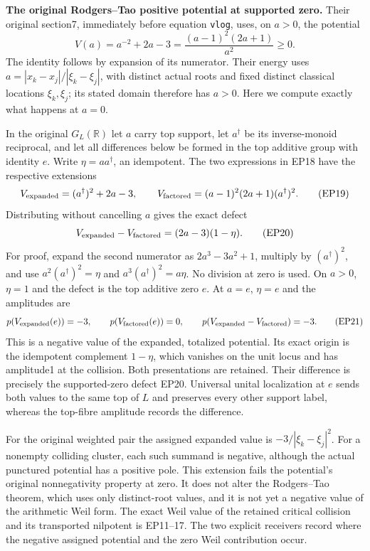 \EP\textbf{The original Rodgers--Tao positive potential at supported zero.}
Their original section7, immediately before equation \texttt{vlog},
uses, on $a>0$, the potential
\[
 V(a)=a^{-2}+2a-3
      =\frac{(a-1)^2(2a+1)}{a^2}\ge0.
 \tag{EP18}\label{ep:potential}
\]
The identity follows by expansion of its numerator. Their energy
uses $a=|x_k-x_j|/|\xi_k-\xi_j|$, with distinct actual roots and
fixed distinct classical locations $\xi_k,\xi_j$; its stated domain
therefore has $a>0$. Here we compute exactly what happens at $a=0$.

In the original $G_L(\mathbb R)$ let $a$ carry top support, let
$a^\dagger$ be its inverse-monoid reciprocal, and let all differences
below be formed in the top additive group with identity $e$.
Write $\eta=aa^\dagger$, an idempotent. The two expressions
in EP18 have the respective extensions
\[
 V_{\rm expanded}=(a^\dagger)^2+2a-3,\qquad
 V_{\rm factored}=(a-1)^2(2a+1)(a^\dagger)^2.
 \tag{EP19}
\]
Distributing without cancelling $a$ gives the exact defect
\[
 V_{\rm expanded}-V_{\rm factored}
           =(2a-3)(1-\eta).
 \tag{EP20}\label{ep:potentialdefect}
\]
For proof, expand the second numerator as $2a^3-3a^2+1$,
multiply by $(a^\dagger)^2$, and use $a^2(a^\dagger)^2=\eta$
and $a^3(a^\dagger)^2=a\eta$. No division at zero is used.
On $a>0$, $\eta=1$ and the defect is the top additive zero $e$.
At $a=e$, $\eta=e$ and the amplitudes are
\[
 p(V_{\rm expanded}(e))=-3,\qquad
 p(V_{\rm factored}(e))=0,\qquad
 p(V_{\rm expanded}-V_{\rm factored})=-3.
 \tag{EP21}
\]
This is a negative value of the expanded, totalized potential.
Its exact origin is the idempotent complement $1-\eta$, which
vanishes on the unit locus and has amplitude1 at the collision.
Both presentations are retained. Their difference is precisely
the supported-zero defect EP20. Universal unital localization at $e$
sends both values to the same top of $L$ and preserves every other
support label, whereas the top-fibre amplitude records the difference.

For the original weighted pair the assigned expanded value is
$-3/|\xi_k-\xi_j|^2$. For a nonempty colliding cluster, each such
summand is negative, although the actual punctured potential has
a positive pole. This extension fails the potential's original
nonnegativity property at zero. It does not alter the Rodgers--Tao
theorem, which uses only distinct-root values, and it is not yet
a negative value of the arithmetic Weil form. The exact Weil value
of the retained critical collision and its transported nilpotent
is EP11--17. The two explicit receivers record where the negative
assigned potential and the zero Weil contribution occur.

